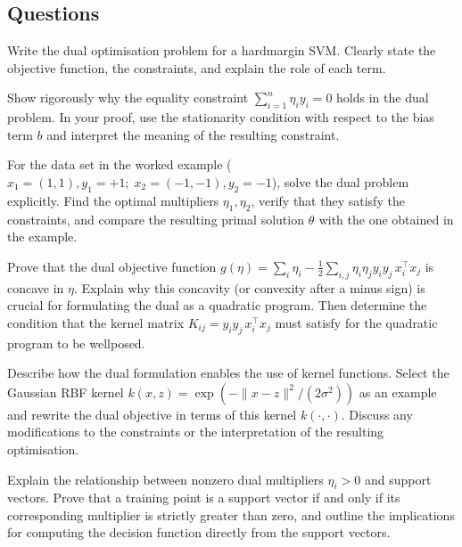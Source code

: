 \documentclass[12pt, a4paper]{article}
\begin{document}
\subsection{Questions}
\begin{problem}
Write the dual optimisation problem for a hardmargin SVM. Clearly state the objective function, the constraints, and explain the role of each term.
\end{problem}
\newpage
\begin{problem}
Show rigorously why the equality constraint \(\displaystyle \sum_{i=1}^{n}\eta_i y_i = 0\) holds in the dual problem.  In your proof, use the stationarity condition with respect to the bias term \(b\) and interpret the meaning of the resulting constraint.
\end{problem}
\newpage
\begin{problem}
For the data set in the worked example (\(x_{1}=(1,1), y_{1}=+1;\;x_{2}=(-1,-1), y_{2}=-1\)), solve the dual problem explicitly.  Find the optimal multipliers \(\eta_1,\eta_2\), verify that they satisfy the constraints, and compare the resulting primal solution \(\theta^{}\) with the one obtained in the example.
\end{problem}
\newpage
\begin{problem}
Prove that the dual objective function \(g(\eta)=\sum_i\eta_i-\frac12\sum_{i,j}\eta_i\eta_jy_i y_j\,x_i^{\!\top}x_j\) is concave in \(\eta\).  Explain why this concavity (or convexity after a minus sign) is crucial for formulating the dual as a quadratic program.  Then determine the condition that the kernel matrix \(K_{ij}=y_i y_j\,x_i^{\!\top}x_j\) must satisfy for the quadratic program to be wellposed.
\end{problem}
\newpage
\begin{problem}
Describe how the dual formulation enables the use of kernel functions.  Select the Gaussian RBF kernel \(k(x,z)=\exp(-\|x-z\|^2/(2\sigma^2))\) as an example and rewrite the dual objective in terms of this kernel \(k(\cdot,\cdot)\).  Discuss any modifications to the constraints or the interpretation of the resulting optimisation.
\end{problem}
\newpage
\begin{problem}
Explain the relationship between nonzero dual multipliers \(\eta_i>0\) and support vectors.  Prove that a training point is a support vector if and only if its corresponding multiplier is strictly greater than zero, and outline the implications for computing the decision function directly from the support vectors.
\end{problem}
\newpage
\end{document}
